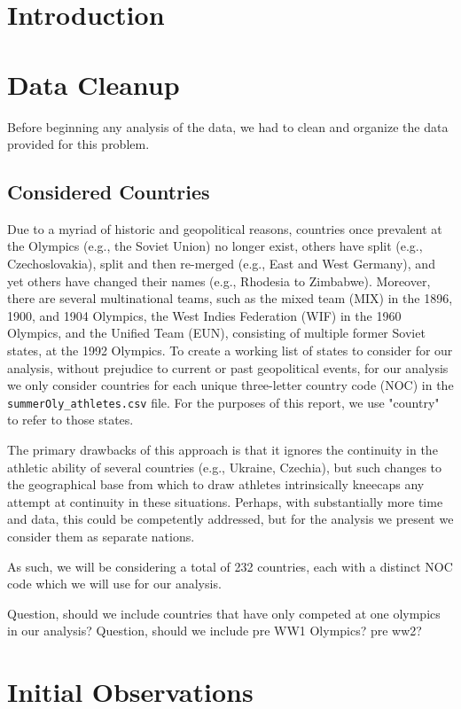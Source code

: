 \documentclass[12pt]{article}
\begin{document}
\section{Introduction}


\section{Data Cleanup}

Before beginning any analysis of the data, we had to clean and organize the data provided for this problem. 


\subsection{Considered Countries}
Due to a myriad of historic and geopolitical reasons, countries once prevalent at the Olympics (e.g., the Soviet Union) no longer exist, others have split (e.g., Czechoslovakia), split and then re-merged (e.g., East and West Germany), and yet others have changed their names (e.g., Rhodesia to Zimbabwe). 
Moreover, there are several multinational teams, such as the mixed team (MIX) in the 1896, 1900, and 1904 Olympics, the West Indies Federation (WIF) in the 1960 Olympics, and the Unified Team (EUN), consisting of multiple former Soviet states, at the 1992 Olympics. 
To create a working list of states to consider for our analysis, without prejudice to current or past geopolitical events, for our analysis we only consider countries for each unique three-letter country code (NOC) in the \verb|summerOly_athletes.csv| file.
For the purposes of this report, we use "country" to refer to those states. 

The primary drawbacks of this approach is that it ignores the continuity in the athletic ability of several countries (e.g., Ukraine, Czechia), but such changes to the geographical base from which to draw athletes intrinsically kneecaps any attempt at continuity in these situations. 
Perhaps, with substantially more time and data, this could be competently addressed, but for the analysis we present we consider them as separate nations.

As such, we will be considering a total of 232 countries, each with a distinct NOC code which we will use for our analysis. 






Question, should we include countries that have only competed at one olympics in our analysis? 
Question, should we include pre WW1 Olympics? pre ww2?



\section{Initial Observations}
\end{document}
